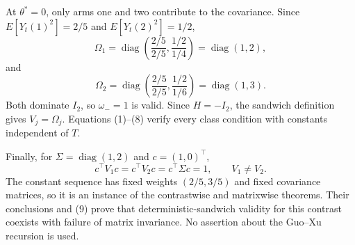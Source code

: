 At \(\theta^*=0\), only arms one and two contribute to the covariance. Since \(E[Y_t(1)^2]=2/5\) and \(E[Y_t(2)^2]=1/2\),
\[
 \Omega_1=\operatorname{diag}\left(\frac{2/5}{2/5},\frac{1/2}{1/4}\right)
 =\operatorname{diag}(1,2), \tag{7}
\]
and
\[
 \Omega_2=\operatorname{diag}\left(\frac{2/5}{2/5},\frac{1/2}{1/6}\right)
 =\operatorname{diag}(1,3). \tag{8}
\]
Both dominate \(I_2\), so \(\omega_-=1\) is valid. Since \(H=-I_2\), the sandwich definition gives \(V_j=\Omega_j\). Equations (1)--(8) verify every class condition with constants independent of \(T\).

Finally, for \(\Sigma=\operatorname{diag}(1,2)\) and \(c=(1,0)^\top\),
\[
 c^\top V_1c=c^\top V_2c=c^\top\Sigma c=1,
 \qquad V_1\ne V_2. \tag{9}
\]
The constant sequence has fixed weights \((2/5,3/5)\) and fixed covariance matrices, so it is an instance of the contrastwise and matrixwise theorems. Their conclusions and (9) prove that deterministic-sandwich validity for this contrast coexists with failure of matrix invariance. No assertion about the Guo--Xu recursion is used.